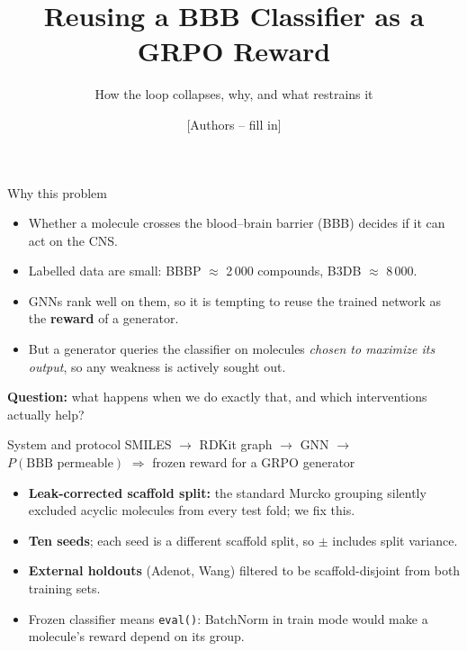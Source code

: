 \documentclass[aspectratio=169,11pt]{beamer}
\title{Reusing a BBB Classifier as a GRPO Reward}
\subtitle{How the loop collapses, why, and what restrains it}
\author{[Authors -- fill in]}
\institute{RECOMB 2027}
\date{}
\begin{document}
\begin{frame}[plain]\titlepage\end{frame}

\begin{frame}{Why this problem}
\begin{itemize}\itemsep4pt
  \item Whether a molecule crosses the blood--brain barrier (BBB) decides if it can act on the CNS.
  \item Labelled data are small: BBBP $\approx$ 2\,000 compounds, B3DB $\approx$ 8\,000.
  \item GNNs rank well on them, so it is tempting to reuse the trained network as the \textbf{reward} of a generator.
  \item But a generator queries the classifier on molecules \emph{chosen to maximize its output}, so any weakness is actively sought out.
\end{itemize}
\vspace{4pt}
\textbf{Question:} what happens when we do exactly that, and which interventions actually help?
\end{frame}

\begin{frame}{System and protocol}
\centering
SMILES $\rightarrow$ RDKit graph $\rightarrow$ GNN $\rightarrow$ $P(\text{BBB permeable})$ \quad $\Longrightarrow$ \quad frozen reward for a GRPO generator
\vspace{6pt}
\begin{itemize}\itemsep3pt
  \item \textbf{Leak-corrected scaffold split:} the standard Murcko grouping silently excluded acyclic molecules from every test fold; we fix this.
  \item \textbf{Ten seeds}; each seed is a different scaffold split, so $\pm$ includes split variance.
  \item \textbf{External holdouts} (Adenot, Wang) filtered to be scaffold-disjoint from both training sets.
  \item Frozen classifier means \texttt{eval()}: BatchNorm in train mode would make a molecule's reward depend on its group.
\end{itemize}
\end{frame}
\end{document}
